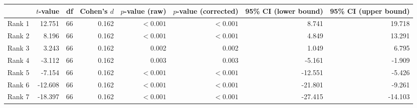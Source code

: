 \begin{tabular}{lrrrrrrr}
\toprule
 & $t$-value & df & Cohen's $d$ & $p$-value (raw) & $p$-value (corrected) & 95\% CI (lower bound) & 95\% CI (upper bound) \\
\midrule
\rowcolor[HTML]{fffee3} Rank 1 & 12.751 & 66 & 0.162 & $< 0.001$ & $< 0.001$ & 8.741 & 19.718 \\
\rowcolor[HTML]{fffee3} Rank 2 & 8.196 & 66 & 0.162 & $< 0.001$ & $< 0.001$ & 4.849 & 13.291 \\
\rowcolor[HTML]{fffee3} Rank 3 & 3.243 & 66 & 0.162 & 0.002 & 0.002 & 1.049 & 6.795 \\
\rowcolor[HTML]{fffee3} Rank 4 & -3.112 & 66 & 0.162 & 0.003 & 0.003 & -5.161 & -1.909 \\
\rowcolor[HTML]{fffee3} Rank 5 & -7.154 & 66 & 0.162 & $< 0.001$ & $< 0.001$ & -12.551 & -5.426 \\
\rowcolor[HTML]{fffee3} Rank 6 & -12.608 & 66 & 0.162 & $< 0.001$ & $< 0.001$ & -21.801 & -9.261 \\
\rowcolor[HTML]{fffee3} Rank 7 & -18.397 & 66 & 0.162 & $< 0.001$ & $< 0.001$ & -27.415 & -14.103 \\
\bottomrule
\end{tabular}
